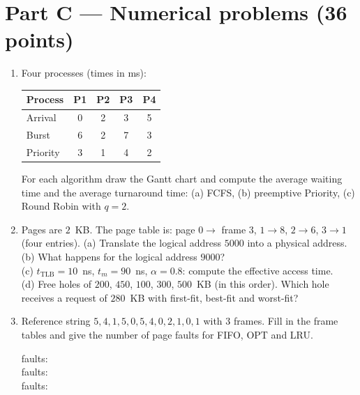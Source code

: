 \section*{Part C --- Numerical problems \hfill (36 points)}
\begin{enumerate}[leftmargin=1.8em,label=C\arabic*.]
  \item Four processes (times in ms):
  \begin{center}
  \begin{tabular}{lcccc}
  \toprule
  Process & P1 & P2 & P3 & P4 \\ \midrule
  Arrival & 0 & 2 & 3 & 5 \\
  Burst & 6 & 2 & 7 & 3 \\
  Priority & 3 & 1 & 4 & 2 \\ \bottomrule
  \end{tabular}
  \end{center}
  For each algorithm draw the Gantt chart and compute the average waiting time and the average turnaround time: (a) FCFS, (b) preemptive Priority, (c) Round Robin with $q = 2$. 
  \ans{4.6cm}
  \item Pages are $2$~KB. The page table is: page $0 \to$ frame $3$, $1 \to 8$, $2 \to 6$, $3 \to 1$ (four entries).
  (a) Translate the logical address $5000$ into a physical address. \\
  (b) What happens for the logical address $9000$? \\
  (c) $t_{\text{TLB}} = 10$~ns, $t_m = 90$~ns, $\alpha = 0.8$: compute the effective access time. \\
  (d) Free holes of $200$, $450$, $100$, $300$, $500$~KB (in this order). Which hole receives a request of $280$~KB with first-fit, best-fit and worst-fit? 
  \ans{5.2cm}
  \item Reference string $5, 4, 1, 5, 0, 5, 4, 0, 2, 1, 0, 1$ with $3$ frames. Fill in the frame tables and give the number of page faults for FIFO, OPT and LRU. 
  \begin{center}
  \small\renewcommand{\arraystretch}{1.2}
  \quad faults: \underline{\hspace{1.2cm}}\\[0.5em]
  \quad faults: \underline{\hspace{1.2cm}}\\[0.5em]
  \quad faults: \underline{\hspace{1.2cm}}

\end{center}
\end{enumerate}
